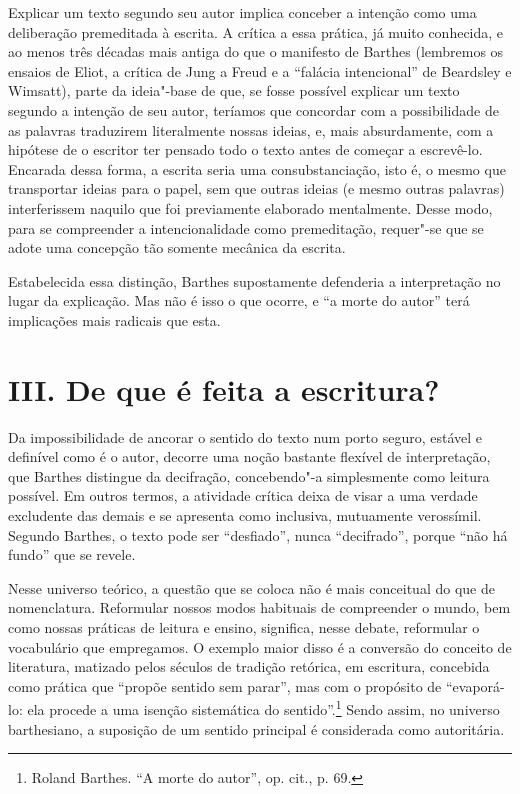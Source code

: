 Explicar um texto segundo seu autor implica conceber a intenção como uma
deliberação premeditada à escrita. A crítica a essa prática, já muito
conhecida, e ao menos três décadas mais antiga do que o manifesto de
Barthes (lembremos os ensaios de Eliot, a crítica de Jung a Freud e a
``falácia intencional'' de Beardsley e Wimsatt), parte da ideia"-base de
que, se fosse possível explicar um texto segundo a intenção de seu
autor, teríamos que concordar com a possibilidade de as palavras
traduzirem literalmente nossas ideias, e, mais absurdamente, com a
hipótese de o escritor ter pensado todo o texto antes de começar a
escrevê-lo. Encarada dessa forma, a escrita seria uma consubstanciação,
isto é, o mesmo que transportar ideias para o papel, sem que outras
ideias (e mesmo outras palavras) interferissem naquilo que foi
previamente elaborado mentalmente. Desse modo, para se compreender a
intencionalidade como premeditação, requer"-se que se adote uma concepção
tão somente mecânica da escrita.

Estabelecida essa distinção, Barthes supostamente defenderia a
interpretação no lugar da explicação. Mas não é isso o que ocorre, e ``a
morte do autor'' terá implicações mais radicais que esta.

\section*{III. De que é feita a escritura?}

Da impossibilidade de ancorar o sentido do texto num porto seguro,
estável e definível como é o autor, decorre uma noção bastante flexível
de interpretação, que Barthes distingue da decifração, concebendo"-a
simplesmente como leitura possível. Em outros termos, a atividade
crítica deixa de visar a uma verdade excludente das demais e se
apresenta como inclusiva, mutuamente verossímil. Segundo Barthes, o
texto pode ser ``desfiado'', nunca ``decifrado'', porque ``não há
fundo'' que se revele.

Nesse universo teórico, a questão que se coloca não é mais conceitual do
que de nomenclatura. Reformular nossos modos habituais de compreender o
mundo, bem como nossas práticas de leitura e ensino, significa, nesse
debate, reformular o vocabulário que empregamos. O exemplo maior disso é
a conversão do conceito de literatura, matizado pelos séculos de
tradição retórica, em escritura, concebida como prática que ``propõe
sentido sem parar'', mas com o propósito de ``evaporá-lo: ela procede a
uma isenção sistemática do sentido''.\footnote{Roland Barthes. ``A morte
  do autor'', op. cit., p. 69.} Sendo assim, no universo barthesiano, a
suposição de um sentido principal é considerada como autoritária.

